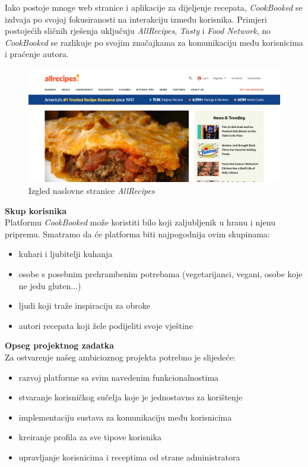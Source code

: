 		\noindent Iako postoje mnoge web stranice i aplikacije za dijeljenje recepata, \textit{CookBooked} se izdvaja po svojoj fokusiranosti na interakciju između korisnika. Primjeri postojećih sličnih rješenja uključuju \textit{AllRecipes}, \textit{Tasty} i \textit{Food Network}, no \textit{CookBooked} se razlikuje po svojim značajkama za komunikaciju među korisnicima i praćenje autora.\\
		\begin{figure}[H]
			\includegraphics[width=\textwidth]{slike/allrecipes.png}
			\caption{Izgled naslovne stranice \textit{AllRecipes}}
			\label{fig:allrecipes}
		\end{figure}			
		
		\noindent\textbf{Skup korisnika}\\

		\noindent Platformu \textit{CookBooked} može koristiti bilo koji zaljubljenik u hranu i njenu pripremu. Smatramo da će platforma biti najpogodnija ovim skupinama:
		\begin{itemize}
			\item kuhari i ljubitelji kuhanja
			\item osobe s posebnim prehrambenim potrebama (vegetarijanci, vegani, osobe koje ne jedu gluten...)
			\item ljudi koji traže inspiraciju za obroke
			\item autori recepata koji žele podijeliti svoje vještine
		\end{itemize}
		\eject

		\noindent\textbf{Opseg projektnog zadatka}\\

		\noindent Za ostvarenje našeg ambicioznog projekta potrebno je slijedeće:
		\begin{itemize}
			\item razvoj platforme sa svim navedenim funkcionalnostima
			\item stvaranje korisničkog sučelja koje je jednostavno za korištenje
			\item implementaciju sustava za komunikaciju među korisnicima
			\item kreiranje profila za sve tipove korisnika
			\item upravljanje korisnicima i receptima od strane administratora
		\end{itemize}
		\vspace{\baselineskip}
		
